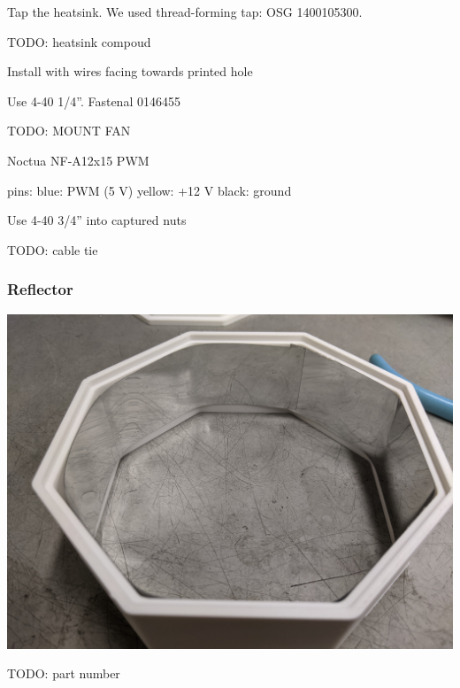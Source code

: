 \documentclass[11pt]{article}
\begin{document}
Tap the heatsink.
We used thread-forming tap: OSG 1400105300.

TODO: heatsink compoud

Install with wires facing towards printed hole

Use 4-40 1/4''.   Fastenal 0146455

TODO: MOUNT FAN

Noctua NF-A12x15 PWM

pins:
blue: PWM (5 V)
yellow: +12 V
black: ground

Use 4-40 3/4'' into captured nuts

TODO: cable tie

\subsubsection{Reflector}

\begin{center}
  \includegraphics[width=\textwidth/2]{"./reflector.jpg"}
\end{center}

TODO: part number
\end{document}
